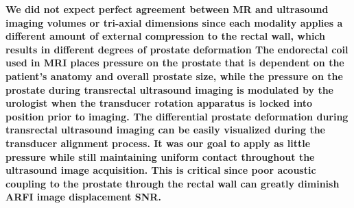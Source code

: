 \textbf{We did not expect perfect agreement between MR and ultrasound imaging
volumes or tri-axial dimensions since each modality applies a different amount
of external compression to the rectal wall, which results in different degrees
of prostate deformation The endorectal coil used in MRI places pressure on the
prostate that is dependent on the patient's anatomy and overall prostate size,
while the pressure on the prostate during transrectal ultrasound imaging is
modulated by the urologist when the transducer rotation apparatus is locked
into position prior to imaging.  The differential prostate deformation during
transrectal ultrasound imaging can be easily visualized during the transducer
alignment process.  It was our goal to apply as little pressure while still
maintaining uniform contact throughout the ultrasound image acquisition. This
is critical since poor acoustic coupling to the prostate through the rectal
wall can greatly diminish ARFI image displacement SNR.}
